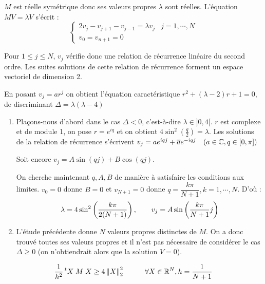 \begin{preuve}
    $M$ est réelle symétrique donc ses valeurs propres $\lambda$ sont réelles.
    L'équation $MV = \lambda V$ s'écrit :
    \[
        \left\lbrace
        \begin{array}{cc}
            2 v_j - v_{j+1} - v_{j-1} = \lambda v_j & j=1,\cdots,N \\
            v_0 = v_{n+1} = 0
        \end{array}
        \right.
    \]

    Pour $1 \leq j \leq N$, $v_j$ vérifie donc une relation de récurrence linéaire
    du second ordre.
    Les suites solutions de cette relation de récurrence forment un espace
    vectoriel de dimension 2.

    En posant $v_j = ar^j$ on obtient l'équation caractéristique
    $r^2 + (\lambda-2) r + 1 = 0$, de discriminant $\Delta = \lambda(\lambda - 4)$

    \begin{enumerate}[label=•]
        \item Plaçons-nous d'abord dans le cas $\Delta < 0$, c'est-à-dire
        $\lambda \in ]0,4[$. $r$ est complexe et de module 1, on pose $r = e^{iq}$
            et on obtient $4 \sin^2 \left(\frac{q}{2}\right) = \lambda$.
            Les solutions de la relation de récurrence s'écrivent
            $v_j = a e^{iqj} + \overline{a} e^{-iqj} \hspace{10pt} (a \in \mathbb{C}, q \in [0,\pi])$

            Soit encore $v_j = A \sin(qj) + B \cos(qj)$.

            On cherche maintenant $q,A,B$ de manière à satisfaire les conditions aux limites.
            $v_0 = 0$ donne $B = 0$ et $v_{N+1} = 0$ donne $q = \dfrac{k\pi}{N+1}, k = 1,\cdots,N$. D'où :
            \[
                \lambda = 4 \sin^2 \left( \frac{k \pi}{2(N+1)} \right),
                \hspace{0.7cm} v_j = A\sin\left( \frac{k\pi}{N+1}j \right)
            \]

        \item L'étude précédente donne $N$ valeurs propres distinctes de $M$.
            On a donc trouvé toutes ses valeurs propres et il n'est pas
            nécessaire de considérer le cas $\Delta \geq 0$ (on n'obtiendrait
            alors que la solution $V = 0$).
    \end{enumerate}
\end{preuve}

\begin{lemme}
    \[
        \frac{1}{h^2} \,^tX \; M \; X \geq 4 \left\lVert X\right\rVert_2^2 \hspace{1cm} \forall X \in \mathbb{R}^N, h = \frac{1}{N+1}
    \]
    \label{lemme:1-pbvp-lemme2}
\end{lemme}


